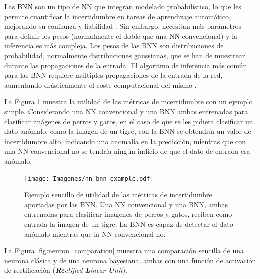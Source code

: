 Las BNN son un tipo de NN que integran modelado probabilístico, lo que les permite cuantificar la incertidumbre en tareas de aprendizaje automático, mejorando su confianza y fiabilidad \cite{bnn_hyper_uncertainty}. Sin embargo, necesitan más parámetros para definir los pesos (normalmente el doble que una NN convencional) y la inferencia es más compleja. Los pesos de las BNN son distribuciones de probabilidad, normalmente distribuciones gaussianas, que se han de muestrear durante las propagaciones de la entrada. El algoritmo de inferencia más común para las BNN requiere múltiples propagaciones de la entrada de la red, aumentando drásticamente el coste computacional del mismo \cite{bnn_theory_paper}. 

La Figura \ref{fig:bnn_vs_nn_example} muestra la utilidad de las métricas de incertidumbre con un ejemplo simple. Considerando una NN convencional y una BNN ambas entrenadas para clasificar imágenes de perros y gatos, en el caso de que se les pidiera clasificar un dato anómalo, como la imagen de un tigre, con la BNN se obtendría un valor de incertidumbre alto, indicando una anomalía en la predicción, mientras que con una NN convencional no se tendría ningún indicio de que el dato de entrada era anómalo.

\begin{figure}[h]
    \centering
    \texttt{[image: Imagenes/nn\_bnn\_example.pdf]}
    \caption{Ejemplo sencillo de utilidad de las métricas de incertidumbre aportadas por las BNN. Una NN convencional y una BNN, ambas entrenadas para clasificar imágenes de perros y gatos, reciben como entrada la imagen de un tigre. La BNN es capaz de detectar el dato anómalo mientras que la NN convencional no.}
    \label{fig:bnn_vs_nn_example}
\end{figure}

La Figura \ref{fig:neuron_comparation} muestra una comparación sencilla de una neurona clásica y de una neurona bayesiana, ambas con una función de activación de rectificación (\textit{\textbf{Re}ctified \textbf{L}inear \textbf{U}nit}).

